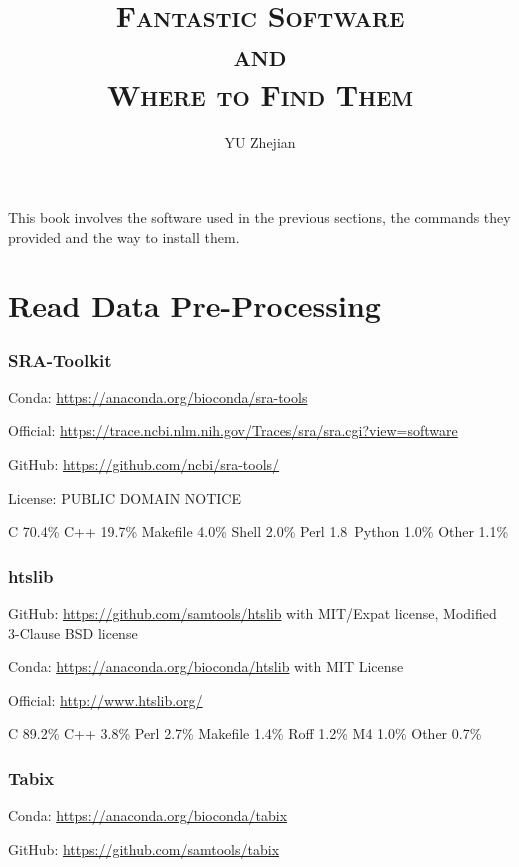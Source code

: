 \documentclass[]{article}
\begin{document}
\title{\fontsize{40}{40}\selectfont\scshape Fantastic Software\\{\Huge and}\\Where to Find Them}
\author{YU Zhejian}
\maketitle
This book involves the software used in the previous sections, the commands they provided and the way to install them.
\tableofcontents
\newpage

\part{Read Data Pre-Processing}
\section{SRA-Toolkit}

Conda: \url{https://anaconda.org/bioconda/sra-tools}

Official: \url{https://trace.ncbi.nlm.nih.gov/Traces/sra/sra.cgi?view=software}

GitHub: \url{https://github.com/ncbi/sra-tools/}

License: PUBLIC DOMAIN NOTICE

C 70.4\% C++ 19.7\% Makefile 4.0\% Shell 2.0\% Perl 1.8\ Python 1.0\% Other 1.1\%



\section{htslib}

GitHub: \url{https://github.com/samtools/htslib} with MIT/Expat license, Modified 3-Clause BSD license

Conda: \url{https://anaconda.org/bioconda/htslib} with MIT License

Official: \url{http://www.htslib.org/}

C 89.2\% C++ 3.8\% Perl 2.7\% Makefile 1.4\% Roff 1.2\% M4 1.0\% Other 0.7\%



\section{Tabix}

Conda: \url{https://anaconda.org/bioconda/tabix}

GitHub: \url{https://github.com/samtools/tabix}
\end{document}
